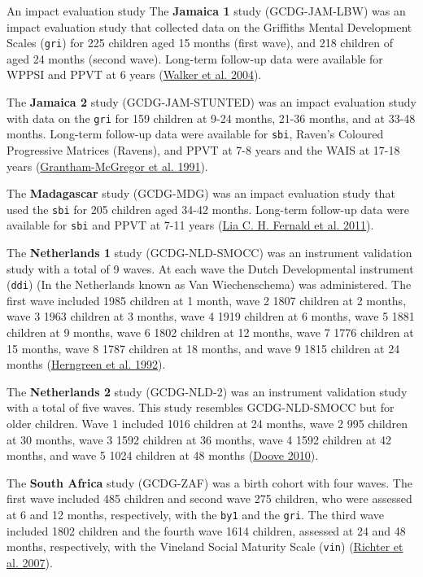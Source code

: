 \documentclass[
]{book}
\begin{document}
An impact evaluation study
The \textbf{Jamaica 1} study (GCDG-JAM-LBW) was an impact evaluation study that collected data on the Griffiths Mental Development Scales (\texttt{gri}) for 225 children aged 15 months (first wave), and 218 children of aged 24 months (second wave). Long-term follow-up data were available for WPPSI and PPVT at 6 years (\protect\hyperlink{ref-Walker2004}{Walker et al. 2004}).

The \textbf{Jamaica 2} study (GCDG-JAM-STUNTED) was an impact evaluation study with data on the \texttt{gri} for 159 children at 9-24 months, 21-36 months, and at 33-48 months. Long-term follow-up data were available for \texttt{sbi}, Raven's Coloured Progressive Matrices (Ravens), and PPVT at 7-8 years and the WAIS at 17-18 years (\protect\hyperlink{ref-Grantham-McGregor1991}{Grantham-McGregor et al. 1991}).

The \textbf{Madagascar} study (GCDG-MDG) was an impact evaluation study that used the \texttt{sbi} for 205 children aged 34-42 months. Long-term follow-up data were available for \texttt{sbi} and PPVT at 7-11 years (\protect\hyperlink{ref-Fernald2011}{Lia C. H. Fernald et al. 2011}).

The \textbf{Netherlands 1} study (GCDG-NLD-SMOCC) was an instrument validation study with a total of 9 waves. At each wave the Dutch Developmental instrument (\texttt{ddi}) (In the Netherlands known as Van Wiechenschema) was administered. The first wave included 1985 children at 1 month, wave 2 1807 children at 2 months, wave 3 1963 children at 3 months, wave 4 1919 children at 6 months, wave 5 1881 children at 9 months, wave 6 1802 children at 12 months, wave 7 1776 children at 15 months, wave 8 1787 children at 18 months, and wave 9 1815 children at 24 months (\protect\hyperlink{ref-herngreen1992}{Herngreen et al. 1992}).

The \textbf{Netherlands 2} study (GCDG-NLD-2) was an instrument validation study with a total of five waves. This study resembles GCDG-NLD-SMOCC but for older children. Wave 1 included 1016 children at 24 months, wave 2 995 children at 30 months, wave 3 1592 children at 36 months, wave 4 1592 children at 42 months, and wave 5 1024 children at 48 months (\protect\hyperlink{ref-doove2010}{Doove 2010}).

The \textbf{South Africa} study (GCDG-ZAF) was a birth cohort with four waves. The first wave included 485 children and second wave 275 children, who were assessed at 6 and 12 months, respectively, with the \texttt{by1} and the \texttt{gri}. The third wave included 1802 children and the fourth wave 1614 children, assessed at 24 and 48 months, respectively, with the Vineland Social Maturity Scale (\texttt{vin}) (\protect\hyperlink{ref-Richter2007}{Richter et al. 2007}).
\end{document}

